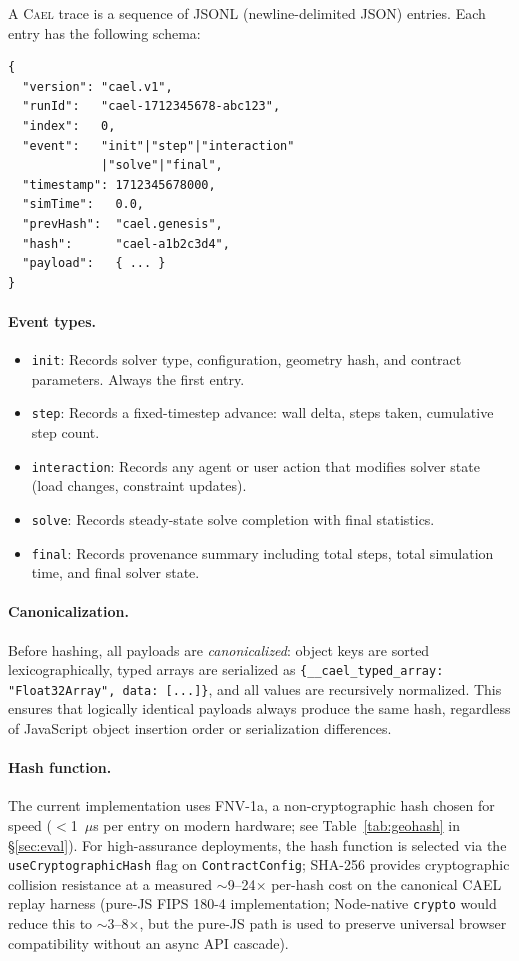 \documentclass[letterpaper,twocolumn,10pt]{article}
\newcommand{\cael}{\textsc{Cael}}
\begin{document}
A \cael{} trace is a sequence of JSONL (newline-delimited JSON) entries.
Each entry has the following schema:

\begin{lstlisting}[language={},numbers=none,frame=none]
{
  "version": "cael.v1",
  "runId":   "cael-1712345678-abc123",
  "index":   0,
  "event":   "init"|"step"|"interaction"
             |"solve"|"final",
  "timestamp": 1712345678000,
  "simTime":   0.0,
  "prevHash":  "cael.genesis",
  "hash":      "cael-a1b2c3d4",
  "payload":   { ... }
}
\end{lstlisting}

\paragraph{Event types.}
\begin{itemize}[nosep,leftmargin=*]
\item \texttt{init}: Records solver type, configuration, geometry hash,
  and contract parameters. Always the first entry.
\item \texttt{step}: Records a fixed-timestep advance: wall delta, steps
  taken, cumulative step count.
\item \texttt{interaction}: Records any agent or user action that modifies
  solver state (load changes, constraint updates).
\item \texttt{solve}: Records steady-state solve completion with final
  statistics.
\item \texttt{final}: Records provenance summary including total steps,
  total simulation time, and final solver state.
\end{itemize}

\paragraph{Canonicalization.} Before hashing, all payloads are
\emph{canonicalized}: object keys are sorted lexicographically, typed arrays
are serialized as \texttt{\{\_\_cael\_typed\_array: "Float32Array", data:
[...]\}}, and all values are recursively normalized. This ensures that
logically identical payloads always produce the same hash, regardless of
JavaScript object insertion order or serialization differences.

\paragraph{Hash function.} The current implementation uses FNV-1a, a
non-cryptographic hash chosen for speed ($<$1~$\mu$s per entry on
modern hardware; see Table~\ref{tab:geohash} in \S\ref{sec:eval}). For
high-assurance deployments, the hash function is selected via the
\texttt{useCryptographicHash} flag on \texttt{ContractConfig}; SHA-256
provides cryptographic collision resistance at a measured
$\sim$9--24$\times$ per-hash cost on the canonical CAEL replay harness
(pure-JS FIPS 180-4 implementation; Node-native \texttt{crypto} would
reduce this to $\sim$3--8$\times$, but the pure-JS path is used to
preserve universal browser compatibility without an async API
cascade).
\end{document}
